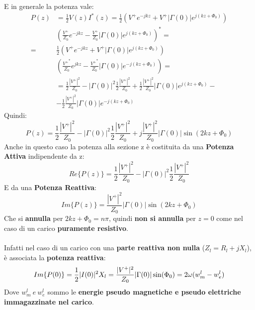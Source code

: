 E in generale la potenza vale:
\begin{equation*}
    \begin{aligned}
    P(z) &= \frac{1}{2} V(z) I^*(z) = \frac{1}{2} \left( V^+ e^{-jkz} + V^+ |\Gamma(0)| e^{j(kz + \Phi_0)}\right) \\
    &{\left(\frac{V^+}{Z_0} e^{-jkz} - \frac{V^+}{Z_0} |\Gamma(0)| e^{j(kz + \Phi_0)} \right)}^* =\\
    =& \frac{1}{2} \left( V^+ e^{-jkz} + V^+ |\Gamma(0)| e^{j(kz + \Phi_0)}\right) \\
    &\left(\frac{{V^+}^*}{Z_0} e^{jkz} - \frac{{V^+}^*}{Z_0} |\Gamma(0)| e^{-j(kz + \Phi_0)} \right)=\\
    &= \frac{1}{2} \frac{|V^+|^2}{Z_0} - |\Gamma(0)|^2 \frac{1}{2} \frac{|V^+|^2}{Z_0} + \frac{1}{2} \frac{|V^+|^2}{Z_0}  |\Gamma(0)| e^{j(kz+\Phi_0)} - \\
       &- \frac{1}{2} \frac{|V^+|^2}{Z_0} |\Gamma(0)| e^{-j(kz+\Phi_0)}
    \end{aligned}
\end{equation*}
Quindi:
\begin{equation*}
    P(z) = \frac{1}{2} \frac{|V^+|^2}{Z_0} - |\Gamma(0)|^2 \frac{1}{2} \frac{|V^+|^2}{Z_0} + j \frac{|V^+|^2}{Z_0} |\Gamma(0)| \sin(2kz +\Phi_0)
\end{equation*}
Anche in questo caso la potenza alla sezione z è costituita da una \textbf{Potenza Attiva} indipendente da z:
\begin{equation*}
    \tag{Potenza Attiva}
    Re\{P(z)\} = \frac{1}{2} \frac{|V^+|^2}{Z_0} - |\Gamma(0)|^2 \frac{1}{2} \frac{|V^+|^2}{Z_0}
\end{equation*}
E da una \textbf{Potenza Reattiva}:
\begin{equation*}
    \tag{Potenza Reattiva}
    Im\{P(z)\} = \frac{|V^+|^2}{Z_0} |\Gamma(0)| \sin(2kz + \Phi_0)
\end{equation*}
Che si \textbf{annulla} per $2kz + \Phi_0 = n\pi$, quindi \textbf{non si annulla} per $z=0$ come nel caso di un carico \textbf{puramente resistivo}.\\ \\
Infatti nel caso di un carico con una \textbf{parte reattiva non nulla} ($Z_l = R_l + j X_l$), è associata la \textbf{potenza reattiva}:
\begin{equation*}
    Im\{P(0)\} = \frac{1}{2} |I(0)|^2 X_l = \frac{|V^+|^2}{Z_0} |\Gamma(0)| \sin(\Phi_0) = 2\omega (w_m^l - w_e^l)
\end{equation*}
Dove $w_m^l \ e \ w_e^l$ sommo le \textbf{energie pseudo magnetiche e pseudo elettriche immagazzinate nel carico}.

























